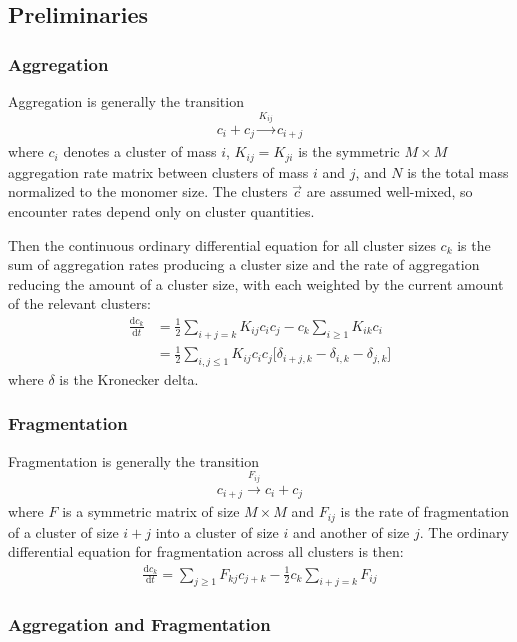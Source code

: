\documentclass[fleqn,10pt]{wlscirep}
\begin{document}
\subsection*{Preliminaries}

\subsubsection*{Aggregation}

Aggregation is generally the transition
$$
    c_{i} + c_{j} \xrightarrow[]{K_{ij}} c_{i+j}
$$
where $c_i$ denotes a cluster of mass $i$, $K_{ij} = K_{ji}$ is the symmetric $M \times M$ aggregation rate matrix between clusters of mass $i$ and $j$, and $N$ is the total mass normalized to the monomer size. The clusters $ \vec{c} $  are assumed well-mixed, so encounter rates depend only on cluster quantities.

Then the continuous ordinary differential equation for all cluster sizes $ c_k $ is the sum of aggregation rates producing a cluster size and the rate of aggregation reducing the amount of a cluster size, with each weighted by the current amount of the relevant clusters:
\begin{align}
    \frac{\mathrm{d} c_{k}}{\mathrm{d} t } & = \frac{1}{2} \sum_{i+j=k} K_{ij} c_{i} c_{j} - c_{k} \sum_{i \geq  1} K_{ik}c_{i} \label{eq:ag_main}
    \\       & = \frac{1}{2} \sum_{i, j \leq  1} K_{ij} c_{i} c_{j} \Big[\delta_{i+j, k} - \delta_{i, k} - \delta_{j, k} \Big]
\end{align}
where $\delta$ is the Kronecker delta.

\subsubsection*{Fragmentation}

Fragmentation is generally the transition
$$
    c_{i+j}  \xrightarrow[]{F_{ij}} c_{i} + c_{j}
$$
where $F$ is a symmetric matrix of size $ M \times M  $ and $F_{ij}$ is the rate of fragmentation of a cluster of size $i+j$ into a cluster of size $i$ and another of size $j$. The ordinary differential equation for fragmentation across all clusters is then:
\begin{align}
    \frac{\mathrm{d} c_{k}}{\mathrm{d} t } = \sum _{j \geq  1} F_{kj}c_{j+k} - \frac{1}{2} c_k \sum _{i+j=k}F_{ij} \label{eq:frg_main}
\end{align}

\subsubsection*{Aggregation and Fragmentation}
\end{document}
